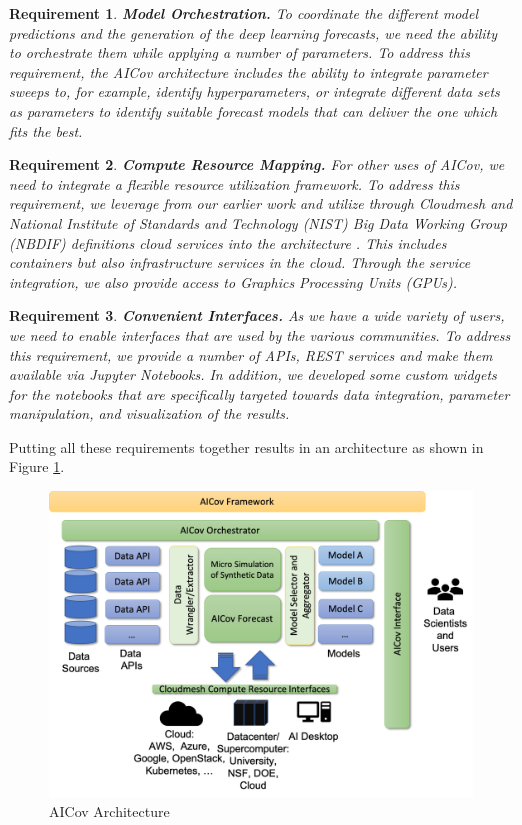 \documentclass[a4paper, inpress]{jds} %
\renewcommand{\_}{%
    \textunderscore\hspace{0pt}%
}
\newtheorem{requirement}{Requirement}
\begin{document}
\begin{requirement}{\bf Model Orchestration.} \normalfont
  To coordinate the different model predictions and the generation of
  the deep learning forecasts, we need the ability to orchestrate them
  while applying a number of parameters. \Solution To address this
  requirement, the AICov architecture includes the ability to
  integrate parameter sweeps to, for example, identify
  hyperparameters, or integrate different data sets as parameters to
  identify suitable forecast models that can deliver the one which
  fits the best.
\end{requirement}

\begin{requirement}{\bf Compute Resource Mapping.} \normalfont
  For other uses of AICov, we need to integrate a flexible resource
  utilization framework. \Solution To address this requirement, we
  leverage from our earlier work and utilize through Cloudmesh and
  National Institute of Standards and Technology (NIST) Big Data
  Working Group (NBDIF) definitions cloud services into the
  architecture \citep{las-19-nist}. This includes containers but also
  infrastructure services in the cloud. Through the service
  integration, we also provide access to Graphics Processing Units
  (GPUs).
\end{requirement}

\begin{requirement}{\bf Convenient Interfaces.} \normalfont
  As we have a wide variety of users, we need to enable interfaces
  that are used by the various communities. \Solution To address this
  requirement, we provide a number of APIs, REST services and make
  them available via Jupyter Notebooks. In addition, we developed some
  custom widgets for the notebooks that are specifically targeted
  towards data integration, parameter manipulation, and visualization
  of the results.
\end{requirement}


Putting all these requirements together results in an architecture as
shown in Figure \ref{fig:arch}.\\

\begin{figure}[h!]
    \centering
    \includegraphics[width=0.6\columnwidth]{images/arch.pdf}
    \caption{AICov Architecture}
    \label{fig:arch}
\end{figure}
\end{document}

